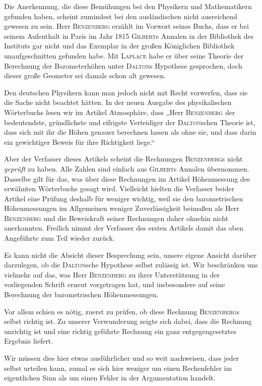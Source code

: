 Die Anerkennung. die diese Bemühungen bei den Physikern und Mathematikern gefunden haben, scheint zumindest bei den ausländischen nicht ausreichend gewesen zu sein. Herr \textsc{Benzenberg} erzählt im Vorwort seines Buchs, dass er bei seinem Aufenthalt in Paris im Jahr 1815 \textsc{Gilbert}s Annalen in der Bibliothek des Instituts gar nicht und das Exemplar in der großen Königlichen Bibliothek unaufgeschnitten gefunden habe. Mit \textsc{Laplace} habe er über seine Theorie der Berechnung der Barometerhöhen unter \textsc{Dalton}s Hypothese gesprochen, doch dieser große Geometer sei damals schon alt gewesen.

Den deutschen Physikern kann man jedoch nicht mit Recht vorwerfen, dass sie die Sache nicht beachtet hätten. In der neuen Ausgabe des physikalischen Wörterbuchs lesen wir im Artikel Atmosphäre, dass „Herr \textsc{Benzenberg} der bedeutendste, gründlichste und eifrigste Verteidiger der \textsc{Dalton}schen Theorie ist, dass sich mit ihr die Höhen genauer berechnen lassen als ohne sie, und dass darin ein gewichtiger Beweis für ihre Richtigkeit liege.“

Aber der Verfasser dieses Artikels scheint die Rechnungen \textsc{Benzenberg}s nicht \textit{geprüft} zu haben. Alle Zahlen sind einfach aus \textsc{Gilbert}s Annalen übernommen. Dasselbe gilt für das, was über diese Rechnungen im Artikel Höhenmessung des erwähnten Wörterbuchs gesagt wird. Vielleicht hielten die Verfasser beider Artikel eine Prüfung deshalb für weniger wichtig, weil sie den barometrischen Höhenmessungen im Allgemeinen weniger Zuverlässigkeit beimaßen als Herr \textsc{Benzenberg} und die Beweiskraft seiner Rechnungen daher ohnehin nicht anerkannten. Freilich nimmt der Verfasser des ersten Artikels damit das oben Angeführte zum Teil wieder zurück.

Es kann nicht die Absicht dieser Besprechung sein, unsere eigene Ansicht darüber darzulegen, ob die \textsc{Dalton}sche Hypothese selbst zulässig ist. Wir beschränken uns vielmehr auf das, was Herr
\textsc{Benzenberg} zu ihrer Unterstützung in der vorliegenden Schrift erneut vorgetragen hat, und insbesondere auf seine Berechnung der barometrischen Höhenmessungen.

Vor allem schien es nötig, zuerst zu prüfen, ob diese Rechnung \textsc{Benzenberg}s selbst richtig ist. Zu unserer Verwunderung zeigte sich dabei, dass die Rechnung unrichtig ist und eine richtig geführte Rechnung ein ganz entgegengesetztes Ergebnis liefert.

Wir müssen dies hier etwas ausführlicher und so weit nachweisen, dass jeder selbst urteilen kann, zumal es sich hier weniger um einen Rechenfehler im eigentlichen Sinn als um einen Fehler in der Argumentation handelt.

